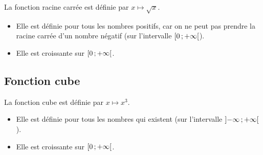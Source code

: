 \documentclass[12pt,a4paper]{article}
\begin{document}
\begin{mydef}
	La fonction racine carrée est définie par $x \mapsto \sqrt{x}$.			
\end{mydef}

\begin{myprops}
	\begin{itemize}
		\item Elle est définie pour tous les nombres positifs, car on ne peut pas prendre la racine carrée d'un nombre négatif (sur l'intervalle $\mbox{\ensuremath{\left[0\mathpunct{};+\infty\right[}}$).
		\item Elle est croissante sur $\mbox{\ensuremath{\left[0\mathpunct{};+ \infty\right[}}$. 
	\end{itemize}
\end{myprops}


\subsection{Fonction cube}


\begin{mydef}
	La fonction cube est définie par $x \mapsto x^3$.			
\end{mydef}

\begin{myprops}
	\begin{itemize}
		\item Elle est définie pour tous les nombres qui existent (sur l'intervalle $\mbox{\ensuremath{\left]- \infty \mathpunct{};+ \infty\right[}}$).
		\item Elle est croissante sur $\mbox{\ensuremath{\left[0\mathpunct{};+ \infty\right[}}$. 
	\end{itemize}
\end{myprops}


\end{document}
